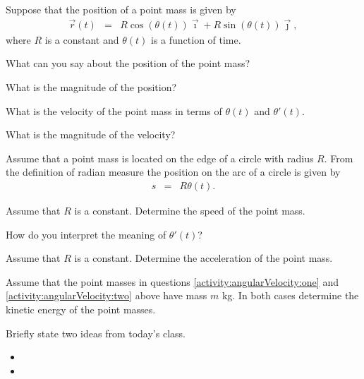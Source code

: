 \begin{problem}
\item Suppose that the position of a point mass is given by
  \begin{eqnarray*}
    \vec{r}(t) & = & R\cos(\theta(t)) \vec{\imath} + R\sin(\theta(t)) \vec{\jmath},
  \end{eqnarray*}
  where $R$ is a constant and $\theta(t)$ is a function of time.
  \label{activity:angularVelocity:one}
  \begin{subproblem}
  \item What can you say about the position of the point mass?
    \vfill
  \item What is the magnitude of the position?
    \vfill
  \item What is the velocity of the point mass in terms of $\theta(t)$
    and $\theta'(t)$.
    \vfill
  \item What is the magnitude of the velocity?
    \vfill
  \end{subproblem}

  \clearpage

\item Assume that a point mass is located on the edge of a circle with
  radius $R$.  From the definition of radian measure the position on
  the arc of a circle is given by
  \begin{eqnarray*}
    s & = & R \theta(t).
  \end{eqnarray*}
  \label{activity:angularVelocity:two}
  \begin{subproblem}
  \item Assume that $R$ is a constant. Determine the speed of the
    point mass.
    \vfill
  \item How do you interpret the meaning of $\theta'(t)$?
    \vfill
  \item Assume that $R$ is a constant. Determine the acceleration of
    the point mass.
    \vfill
  \end{subproblem}

\clearpage

\item Assume that the point masses in questions
  \ref{activity:angularVelocity:one} and
  \ref{activity:angularVelocity:two} above have mass $m$ kg. In both
  cases determine the kinetic energy of the point masses.

\end{problem}


\postClass

\begin{problem}
\item Briefly state two ideas from today's class.
  \begin{itemize}
  \item
  \item
  \end{itemize}
\item
  \begin{subproblem}
    \item
  \end{subproblem}
\end{problem}




